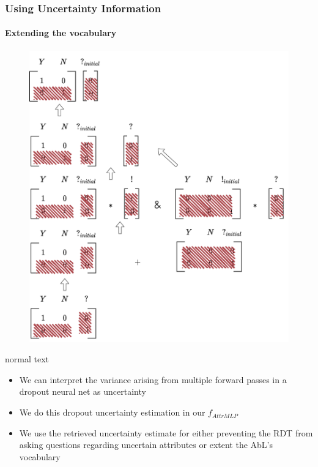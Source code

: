 \documentclass[9pt]{beamer}
\begin{document}
\begin{frame}
\frametitle{Using Uncertainty Information}
\framesubtitle{Extending the vocabulary}
\begin{figure}
	\includegraphics[width=0.6\linewidth]{images/extended_vocab_backward.pdf}
\end{figure}
\end{frame}



\begin{frame}[plain]{normal text}
\begin{itemize}
	\item We can interpret the variance arising from multiple forward passes in a dropout neural net as uncertainty
	\item We do this dropout uncertainty estimation in our $f_{AttrMLP}$
	\item We use the retrieved uncertainty estimate for either preventing the RDT from asking questions regarding uncertain attributes or extent the AbL's vocabulary
	
\end{itemize}
\end{frame}
\end{document}
